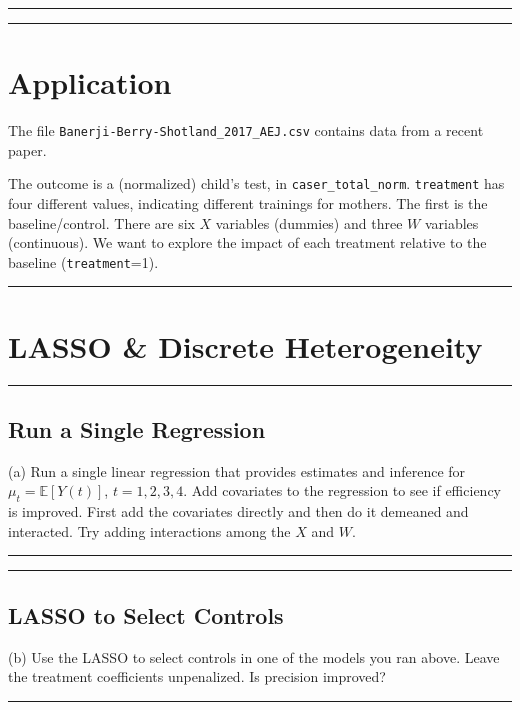 \documentclass{article}
\newenvironment{colorparagraph}[1]{\par\color{#1}}{\par}
\begin{document}
\begin{colorparagraph}{questioncolor}

\rule{\textwidth}{0.5pt}
\label{q3}
\rule{\textwidth}{0.5pt}
\section{Application}

The file \texttt{Banerji-Berry-Shotland\_2017\_AEJ.csv} contains data from a recent paper.

The outcome is a (normalized) child’s test, in \texttt{caser\_total\_norm}. \texttt{treatment} has four different values, indicating different trainings for mothers. The first is the baseline/control. There are six \( X \) variables (dummies) and three \( W \) variables (continuous). We want to explore the impact of each treatment relative to the baseline (\texttt{treatment}=1).

\rule{\textwidth}{0.5pt}
\end{colorparagraph}

\begin{colorparagraph}{questioncolor}
\section*{LASSO \& Discrete Heterogeneity}
\label{q3a}
\rule{\textwidth}{0.5pt}
\subsection{Run a Single Regression}
(a) Run a single linear regression that provides estimates and inference for \( \mu_t = \mathbb{E}[Y(t)] \), \( t = 1, 2, 3, 4 \). Add covariates to the regression to see if efficiency is improved. First add the covariates directly and then do it demeaned and interacted. Try adding interactions among the \( X \) and \( W \).

\rule{\textwidth}{0.5pt}
\end{colorparagraph}

\begin{colorparagraph}{questioncolor}
\label{q3b}
\rule{\textwidth}{0.5pt}
\subsection{LASSO to Select Controls}
(b) Use the LASSO to select controls in one of the models you ran above. Leave the treatment coefficients unpenalized. Is precision improved?

\rule{\textwidth}{0.5pt}
\end{colorparagraph}
\end{document}
